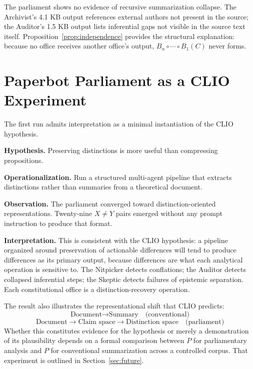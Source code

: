 \documentclass[12pt, a4paper]{article}
\theoremstyle{principle}
\theoremstyle{definition}
\begin{document}
The parliament shows no evidence of recursive summarization collapse. The
Archivist's 4.1 KB output references external authors not present in the source;
the Auditor's 1.5 KB output lists inferential gaps not visible in the source text
itself. Proposition~\ref{prop:independence} provides the structural explanation:
because no office receives another office's output, $B_n \circ \cdots \circ B_1(C)$
never forms.

\section{Paperbot Parliament as a CLIO Experiment}
\label{sec:clio}

The first run admits interpretation as a minimal instantiation of the CLIO
hypothesis.

\medskip
\noindent\textbf{Hypothesis.}
Preserving distinctions is more useful than compressing propositions.

\medskip
\noindent\textbf{Operationalization.}
Run a structured multi-agent pipeline that extracts distinctions rather than
summaries from a theoretical document.

\medskip
\noindent\textbf{Observation.}
The parliament converged toward distinction-oriented representations. Twenty-nine
$X \neq Y$ pairs emerged without any prompt instruction to produce that format.

\medskip
\noindent\textbf{Interpretation.}
This is consistent with the CLIO hypothesis: a pipeline organized around
preservation of actionable differences will tend to produce differences as its
primary output, because differences are what each analytical operation is
sensitive to. The Nitpicker detects conflations; the Auditor detects collapsed
inferential steps; the Skeptic detects failures of epistemic separation.
Each constitutional office is a distinction-recovery operation.

\medskip
The result also illustrates the representational shift that CLIO predicts:
\[
\text{Document} \longrightarrow \text{Summary}
\quad\text{(conventional)}
\]
\[
\text{Document} \longrightarrow \text{Claim space}
              \longrightarrow \text{Distinction space}
\quad\text{(parliament)}
\]
Whether this constitutes evidence for the hypothesis or merely a demonstration of
its plausibility depends on a formal comparison between $P$ for parliamentary
analysis and $P$ for conventional summarization across a controlled corpus.
That experiment is outlined in Section~\ref{sec:future}.
\end{document}
